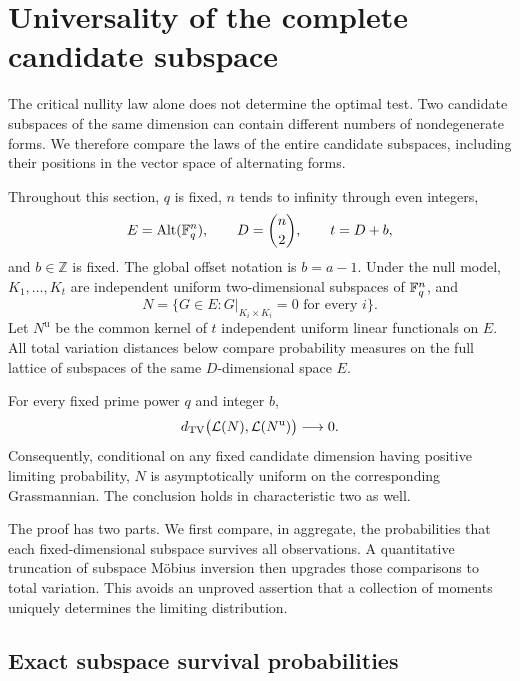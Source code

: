\section{Universality of the complete candidate subspace}
\label{sec:kernel-universality}

The critical nullity law alone does not determine the optimal test.
Two candidate subspaces of the same dimension can contain different
numbers of nondegenerate forms.  We therefore compare the laws of the
entire candidate subspaces, including their positions in the vector
space of alternating forms.

Throughout this section, $q$ is fixed, $n$ tends to infinity through
even integers,
\[
 E=\operatorname{Alt}(\mathbb F_q^n),\qquad D=\binom n2,\qquad t=D+b,
\]
and $b\in\mathbb Z$ is fixed.  The global offset notation is
$b=a-1$.  Under the null model, $K_1,\ldots,K_t$ are independent
uniform two-dimensional subspaces of $\mathbb F_q^n$, and
\[
 N=\{G\in E:G|_{K_i\times K_i}=0\text{ for every }i\}.
\]
Let $N^{\mathrm u}$ be the common kernel of $t$ independent uniform
linear functionals on $E$.  All total variation distances below
compare probability measures on the full lattice of subspaces of
the same $D$-dimensional space $E$.

\begin{theorem}
\label{ker:theorem}
For every fixed prime power $q$ and integer $b$,
\[
 d_{\mathrm{TV}}\bigl(\mathcal L(N),\mathcal L(N^{\mathrm u})\bigr)
 \longrightarrow0.
\]
Consequently, conditional on any fixed candidate dimension having
positive limiting probability, $N$ is asymptotically uniform on the
corresponding Grassmannian.  The conclusion holds in characteristic
two as well.
\end{theorem}

The proof has two parts.  We first compare, in aggregate, the
probabilities that each fixed-dimensional subspace survives all
observations.  A quantitative truncation of subspace M\"obius
inversion then upgrades those comparisons to total variation.  This
avoids an unproved assertion that a collection of moments uniquely
determines the limiting distribution.

\subsection{Exact subspace survival probabilities}

